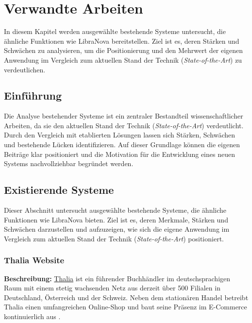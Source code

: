 \chapter{Verwandte Arbeiten}

In diesem Kapitel werden ausgewählte bestehende Systeme untersucht, die ähnliche Funktionen wie LibraNova bereitstellen. Ziel ist es, deren Stärken und Schwächen zu analysieren, um die Positionierung und den Mehrwert der eigenen Anwendung im Vergleich zum aktuellen Stand der Technik (\emph{State-of-the-Art}) zu verdeutlichen.


\section{Einführung}

Die Analyse bestehender Systeme ist ein zentraler Bestandteil wissenschaftlicher Arbeiten, da sie den aktuellen Stand der Technik (\emph{State-of-the-Art}) verdeutlicht. Durch den Vergleich mit etablierten Lösungen lassen sich Stärken, Schwächen und bestehende Lücken identifizieren. Auf dieser Grundlage können die eigenen Beiträge klar positioniert und die Motivation für die Entwicklung eines neuen Systems nachvollziehbar begründet werden.


\section{Existierende Systeme}

Dieser Abschnitt untersucht ausgewählte bestehende Systeme, die ähnliche Funktionen wie LibraNova bieten. Ziel ist es, deren Merkmale, Stärken und Schwächen darzustellen und aufzuzeigen, wie sich die eigene Anwendung im Vergleich zum aktuellen Stand der Technik (\emph{State-of-the-Art}) positioniert.

\subsection{Thalia Website}

\textbf{Beschreibung:} \href{https://www.thalia.de/}{Thalia} ist ein führender Buchhändler im deutschsprachigen Raum mit einem stetig wachsenden Netz aus derzeit über 500 Filialen in Deutschland, Österreich und der Schweiz. Neben dem stationären Handel betreibt Thalia einen umfangreichen Online-Shop und baut seine Präsenz im E-Commerce kontinuierlich aus \cite{thaliaUnternehmen2025a}.

